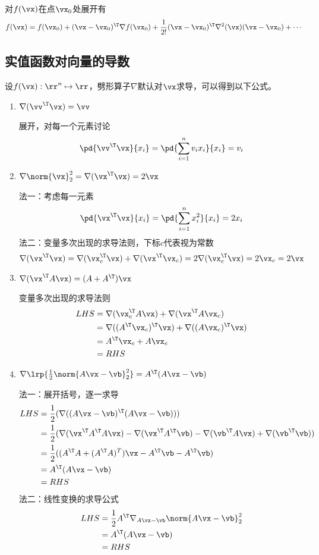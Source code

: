 \begin{definition}[Taylor公式]
对$f(\vx)$在点$\vx_0$处展开有
\[f(\vx)=f(\vx_0)+(\vx-\vx_0)^\T\nabla f(\vx_0)+\frac{1}{2!}(\vx-\vx_0)^\T \nabla^2(\vx)(\vx-\vx_0)+\cdots\]
\end{definition}

\subsection{实值函数对向量的导数}
设$f(\vx):\rr^n\mapsto\rr$，劈形算子$\nabla$默认对$\vx$求导，可以得到以下公式。
\begin{enumerate}
\item $\nabla (\vv^\T\vx)=\vv$
\begin{analysis}
    展开，对每一个元素讨论
    \[\pd{\vv^\T\vx}{x_i}=\pd{\sum_{i=1}^n v_i x_i}{x_i}=v_i\]
\end{analysis}
\item $\nabla\norm{\vx}_2^2=\nabla(\vx^\T\vx)=2\vx$
\begin{analysis}
    法一：考虑每一元素
    \[\pd{\vx^\T\vx}{x_i}=\pd{\sum_{i=1}^n x_i^2}{x_i}=2x_i\]
    法二：变量多次出现的求导法则，下标$c$代表视为常数
    \[\nabla(\vx^\T\vx)=\nabla(\vx_c^\T\vx)+\nabla(\vx^\T\vx_c)=2\nabla(\vx_c^\T\vx)=2\vx_c=2\vx\]
\end{analysis}
\item $\nabla(\vx^\T A\vx)=(A+A^\T)\vx$
\begin{analysis}
    变量多次出现的求导法则
    \[\begin{aligned}
        LHS&=\nabla(\vx_c^\T A\vx)+\nabla(\vx^\T A\vx_c)\\
        &=\nabla((A^\T\vx_c)^\T\vx)+\nabla((A\vx_c)^\T \vx)\\
        &=A^\T\vx_c+A\vx_c\\
        &=RHS
    \end{aligned}\]
\end{analysis}
\item $\nabla\lrp{\frac{1}{2}\norm{A\vx-\vb}_2^2}=A^\T(A\vx-\vb)$
\begin{analysis}
    法一：展开括号，逐一求导
    \[\begin{aligned}
        LHS&=\frac{1}{2}(\nabla((A\vx-\vb)^\T(A\vx-\vb)))\\
        &=\frac{1}{2}(\nabla(\vx^\T A^\T A\vx)-\nabla(\vx^\T A^\T\vb)-\nabla(\vb^\T A\vx)+\nabla(\vb^\T\vb))\\
        &=\frac{1}{2}((A^\T A+(A^\T A)^T)\vx-A^\T\vb-A^\T\vb)\\
        &=A^\T(A\vx-\vb)\\
        &=RHS
    \end{aligned}\]
    法二：线性变换的求导公式
    \[\begin{aligned}
        LHS&=\frac{1}{2}A^\T\nabla_{A\vx-\vb}\norm{A\vx-\vb}_2^2\\
        &=A^\T(A\vx-\vb)\\
        &=RHS
    \end{aligned}\]
\end{analysis}
\end{enumerate}

